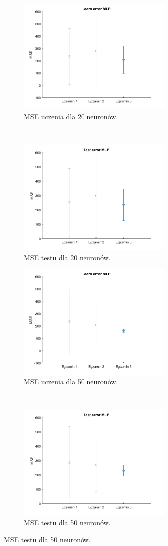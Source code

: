 \documentclass[12pt]{article}
\begin{document}
\begin{figure}[H]
\centering
\begin{subfigure}[t]{0.48\textwidth} 
\centering
\includegraphics[height=2.2in]{tansig_tansig20_learn.png}
\caption{MSE uczenia dla 20 neuronów.}
\end{subfigure}
~~
\begin{subfigure}[t]{0.48\textwidth} 
\centering
\includegraphics[height=2.2in]{tansig_tansig20_test.png}
\caption{MSE testu dla 20 neuronów.}
\end{subfigure}

\begin{subfigure}[t]{0.48\textwidth} 
\centering
\includegraphics[height=2.2in]{tansig_tansig50_learn.png}
\caption{MSE uczenia dla 50 neuronów.}
\end{subfigure}
~~
\begin{subfigure}[t]{0.48\textwidth} 
\centering
\includegraphics[height=2.2in]{tansig_tansig50_test.png}
\caption{MSE testu dla 50 neuronów.}
\end{subfigure}


\end{figure}
\end{document}
